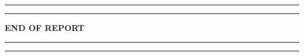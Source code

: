 \documentclass[a4paper]{report}
\begin{document}
\linenumbers



\begingroup

\renewcommand\thesection{\arabic{chapter}.\arabic{section}}
\renewcommand\thesubsection{\thesection.\arabic{subsection}}
\renewcommand\thesubsubsection{\thesubsection.\arabic{subsubsection}}














\endgroup

\pagestyle{empty}

\vspace*{\fill}
\begin{center}
  \rule{.8\textwidth}{2pt}
  \rule{1\textwidth}{2pt}
  \vspace{3em}

  {\Huge\textbf{END OF REPORT}\par}

  \vspace{3em}
  \rule{1\textwidth}{2pt}
  \rule{.8\textwidth}{2pt}
\end{center}
\vspace*{\fill}

\newpage


\end{document}
